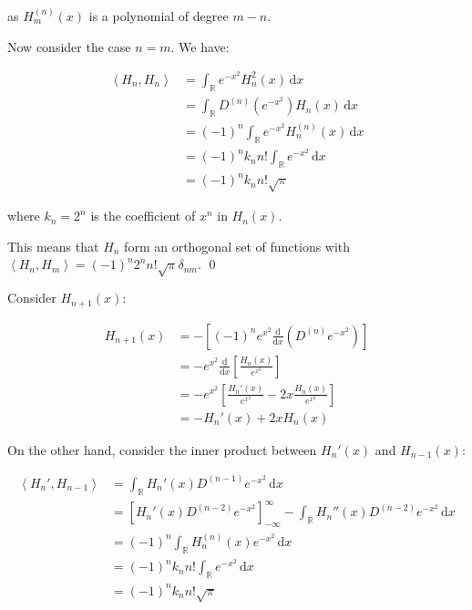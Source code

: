 \documentclass[12pt]{article}
\begin{document}
as $H_{m}^{(n)}(x)$ is a polynomial of degree $m - n$.

Now consider the case $n = m$. We have:

\begin{equation}
\begin{split}
    \left\langle H_{n}, H_{n} \right\rangle &= \int_{\mathbb{R}} e^{-x^{2}} H_{n}^{2}(x) \, \mathrm{d}x \\
    &= \int_{\mathbb{R}} D^{(n)} \left( e^{-x^{2}} \right) H_{n}(x) \, \mathrm{d}x \\
    &= (-1)^{n} \int_{\mathbb{R}} e^{-x^{2}} H_{n}^{(n)}(x) \, \mathrm{d}x \\
    &= (-1)^{n} k_{n} n! \int_{\mathbb{R}} e^{-x^{2}} \, \mathrm{d}x \\
    &= (-1)^{n} k_{n} n! \sqrt{\pi}
\end{split}
\end{equation}

where $k_{n} = 2^{n}$ is the coefficient of $x^{n}$ in $H_{n}(x)$.

This means that $H_{n}$ form an orthogonal set of functions with $\left\langle H_{n}, H_{m} \right\rangle = (-1)^{n} 2^{n} n! \sqrt{\pi} \delta_{nm}$.
\qed


Consider $H_{n+1}(x)$:

\begin{equation}
\begin{split}
    H_{n+1}(x) &= -\left[ (-1)^{n} e^{x^{2}}  \frac{\mathrm{d}}{\mathrm{d}x} \left( D^{(n)} e^{-x^{2}} \right) \right] \\
    &= -e^{x^{2}} \frac{\mathrm{d}}{\mathrm{d}x} \left[ \frac{H_{n}(x)}{e^{x^{2}}} \right] \\
    &= -e^{x^{2}} \left[ \frac{H_{n}'(x)}{e^{x^{2}}} - 2x \frac{H_{n}(x)}{e^{x^{2}}} \right] \\
    &= -H_{n}'(x) + 2x H_{n}(x)
\end{split}
\end{equation}

On the other hand, consider the inner product between $H_{n}'(x)$ and $H_{n-1}(x)$:

\begin{equation}
\begin{split}
    \left\langle H_{n}', H_{n-1} \right\rangle &= \int_{\mathbb{R}} H_{n}'(x) D^{(n-1)} e^{-x^{2}} \, \mathrm{d}x \\
    &= \left[ H_{n}'(x) D^{(n-2)} e^{-x^{2}} \right]_{-\infty}^{\infty} - \int_{\mathbb{R}} H_{n}''(x) D^{(n-2)} e^{-x^{2}} \, \mathrm{d}x \\
    &= (-1)^{n} \int_{\mathbb{R}} H_{n}^{(n)}(x) e^{-x^{2}} \, \mathrm{d}x \\
    &= (-1)^{n} k_{n} n! \int_{\mathbb{R}} e^{-x^{2}} \, \mathrm{d}x \\
    &= (-1)^{n} k_{n} n! \sqrt{\pi}
\end{split}
\end{equation}
\end{document}
